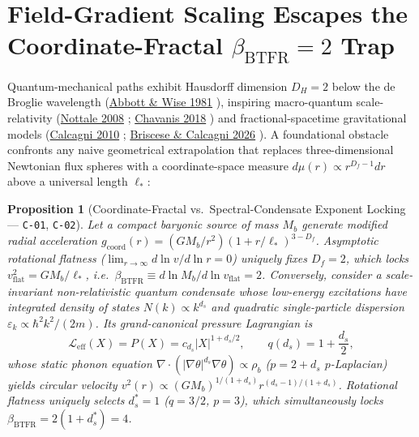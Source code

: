 \documentclass[11pt,letterpaper]{article}
\newtheorem{proposition}[theorem]{Proposition}
\begin{document}
\section{Field-Gradient Scaling Escapes the Coordinate-Fractal $\beta_{\mathrm{BTFR}} = 2$ Trap}

Quantum-mechanical paths exhibit Hausdorff dimension $D_H = 2$ below the de Broglie wavelength (\href{https://pubs.aip.org/aapt/ajp/article/49/1/37/1051491/Dimension-of-a-quantum-mechanical-path}{Abbott \& Wise 1981} \cite{AbbottWise1981}), inspiring macro-quantum scale-relativity (\href{https://arxiv.org/pdf/0812.3857}{Nottale 2008} \cite{Nottale2008}; \href{https://arxiv.org/pdf/1706.05900}{Chavanis 2018} \cite{Chavanis2018}) and fractional-spacetime gravitational models (\href{https://link.aps.org/doi/10.1103/PhysRevLett.104.251301}{Calcagni 2010} \cite{Calcagni2010}; \href{https://arxiv.org/html/2603.24593v2}{Briscese \& Calcagni 2026} \cite{BrisceseCalcagni2026}). A foundational obstacle confronts any naive geometrical extrapolation that replaces three-dimensional Newtonian flux spheres with a coordinate-space measure $d\mu(r) \propto r^{D_f - 1} dr$ above a universal length $\ell_*$:

\begin{proposition}[Coordinate-Fractal vs.\ Spectral-Condensate Exponent Locking --- \texttt{C-01}, \texttt{C-02}]
Let a compact baryonic source of mass $M_b$ generate modified radial acceleration $g_{\mathrm{coord}}(r) = (G M_b / r^2)(1 + r/\ell_*)^{3 - D_f}$. Asymptotic rotational flatness ($\lim_{r\to\infty} d\ln v/d\ln r = 0$) uniquely fixes $D_f = 2$, which locks $v_{\mathrm{flat}}^2 = G M_b / \ell_*$, i.e.\ $\beta_{\mathrm{BTFR}} \equiv d\ln M_b / d\ln v_{\mathrm{flat}} = 2$. Conversely, consider a scale-invariant non-relativistic quantum condensate whose low-energy excitations have integrated density of states $N(k) \propto k^{d_s}$ and quadratic single-particle dispersion $\varepsilon_k \propto \hbar^2 k^2 / (2m)$. Its grand-canonical pressure Lagrangian is
\begin{equation}
  \mathcal{L}_{\mathrm{eff}}(X) = P(X) = c_{d_s} |X|^{1 + d_s/2}, \qquad q(d_s) = 1 + \frac{d_s}{2},
  \label{eq:spectral_action}
\end{equation}
whose static phonon equation $\nabla\cdot(|\nabla\theta|^{d_s}\nabla\theta) \propto \rho_b$ ($p = 2 + d_s$ $p$-Laplacian) yields circular velocity $v^2(r) \propto (G M_b)^{1/(1 + d_s)} r^{(d_s - 1)/(1 + d_s)}$. Rotational flatness uniquely selects $d_s^* = 1$ ($q = 3/2$, $p = 3$), which simultaneously locks $\beta_{\mathrm{BTFR}} = 2(1 + d_s^*) = 4$.
\end{proposition}
\end{document}
